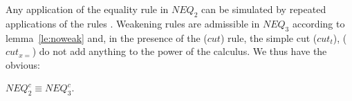 \noindent
Any application of the equality rule  in $NEQ_2$ can be simulated
by repeated applications of the rules . %
Weakening rules are admissible in $NEQ_3$ according to lemma~\ref{le:noweak} and, in
the presence of the ($cut$) rule, the simple cut ($cut_t$), ($cut_{x=}$) 
do not add anything to the power of the calculus. 
We thus have the obvious:
\begin{CLAIM}\label{le:neq2isneq3}
 $NEQ_2^c \equiv NEQ_3^c$.
\end{CLAIM}